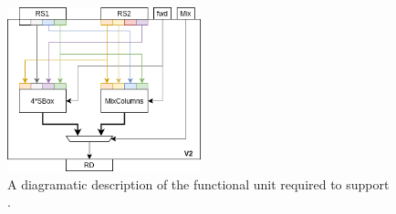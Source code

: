 \begin{figure}[!h]
\centering
\includegraphics[width={0.5\textwidth}]{diagrams/ise-datapath-v2.png}
\caption{
  A diagramatic description of the functional unit required to support .
}
\label{fig:v2:fu}
\end{figure}


